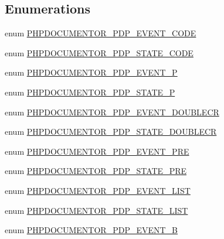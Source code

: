 \subsection*{\-Enumerations}
\begin{DoxyCompactItemize}
\item 
enum \hyperlink{_parser_desc_cleanup_8inc_acb0ff99f327be83a8a5fdf01a497aba4}{\-P\-H\-P\-D\-O\-C\-U\-M\-E\-N\-T\-O\-R\-\_\-\-P\-D\-P\-\_\-\-E\-V\-E\-N\-T\-\_\-\-C\-O\-D\-E} 
\item 
enum \hyperlink{_parser_desc_cleanup_8inc_a01de44b601b88f419e408efd7d461661}{\-P\-H\-P\-D\-O\-C\-U\-M\-E\-N\-T\-O\-R\-\_\-\-P\-D\-P\-\_\-\-S\-T\-A\-T\-E\-\_\-\-C\-O\-D\-E} 
\item 
enum \hyperlink{_parser_desc_cleanup_8inc_af281c766c45ab1fcc9bec449359fcdcd}{\-P\-H\-P\-D\-O\-C\-U\-M\-E\-N\-T\-O\-R\-\_\-\-P\-D\-P\-\_\-\-E\-V\-E\-N\-T\-\_\-\-P} 
\item 
enum \hyperlink{_parser_desc_cleanup_8inc_ab93db84e99a31bbfa16aecee5cf0e471}{\-P\-H\-P\-D\-O\-C\-U\-M\-E\-N\-T\-O\-R\-\_\-\-P\-D\-P\-\_\-\-S\-T\-A\-T\-E\-\_\-\-P} 
\item 
enum \hyperlink{_parser_desc_cleanup_8inc_a38e078f2e44628b1774e42a90a6645f3}{\-P\-H\-P\-D\-O\-C\-U\-M\-E\-N\-T\-O\-R\-\_\-\-P\-D\-P\-\_\-\-E\-V\-E\-N\-T\-\_\-\-D\-O\-U\-B\-L\-E\-C\-R} 
\item 
enum \hyperlink{_parser_desc_cleanup_8inc_abcb0e4a5c4d585618edd64727a882c2d}{\-P\-H\-P\-D\-O\-C\-U\-M\-E\-N\-T\-O\-R\-\_\-\-P\-D\-P\-\_\-\-S\-T\-A\-T\-E\-\_\-\-D\-O\-U\-B\-L\-E\-C\-R} 
\item 
enum \hyperlink{_parser_desc_cleanup_8inc_a429fddf7f35ca4f06d3b4151684f9794}{\-P\-H\-P\-D\-O\-C\-U\-M\-E\-N\-T\-O\-R\-\_\-\-P\-D\-P\-\_\-\-E\-V\-E\-N\-T\-\_\-\-P\-R\-E} 
\item 
enum \hyperlink{_parser_desc_cleanup_8inc_a8ff660366e5cf907be09faab9c6fdc5c}{\-P\-H\-P\-D\-O\-C\-U\-M\-E\-N\-T\-O\-R\-\_\-\-P\-D\-P\-\_\-\-S\-T\-A\-T\-E\-\_\-\-P\-R\-E} 
\item 
enum \hyperlink{_parser_desc_cleanup_8inc_a1e322094a55fa96a5d5c049f1d3c242c}{\-P\-H\-P\-D\-O\-C\-U\-M\-E\-N\-T\-O\-R\-\_\-\-P\-D\-P\-\_\-\-E\-V\-E\-N\-T\-\_\-\-L\-I\-S\-T} 
\item 
enum \hyperlink{_parser_desc_cleanup_8inc_a6b8b5094298936ddffaf35a41b461438}{\-P\-H\-P\-D\-O\-C\-U\-M\-E\-N\-T\-O\-R\-\_\-\-P\-D\-P\-\_\-\-S\-T\-A\-T\-E\-\_\-\-L\-I\-S\-T} 
\item 
enum \hyperlink{_parser_desc_cleanup_8inc_a486ad69eaaef78ab0a00db0a57519a56}{\-P\-H\-P\-D\-O\-C\-U\-M\-E\-N\-T\-O\-R\-\_\-\-P\-D\-P\-\_\-\-E\-V\-E\-N\-T\-\_\-\-B} 

\end{DoxyCompactItemize}

